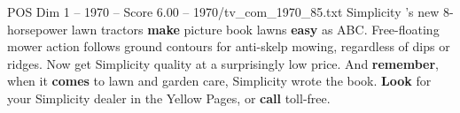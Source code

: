 \begin{textsample}{POS Dim 1 – 1970 – Score 6.00 – 1970/tv\_com\_1970\_85.txt}  \label{ex:f1_pos_031}
Simplicity 's new 8-horsepower lawn tractors \textbf{make} picture book lawns \textbf{easy} as ABC.
Free-floating mower action follows ground contours for anti-skelp mowing, regardless of dips or ridges.
Now get Simplicity quality at a surprisingly low price.
And \textbf{remember}, when it \textbf{comes} to lawn and garden care, Simplicity wrote the book. \textbf{Look} for your Simplicity dealer in the Yellow Pages, or \textbf{call} toll-free.

\end{textsample}

